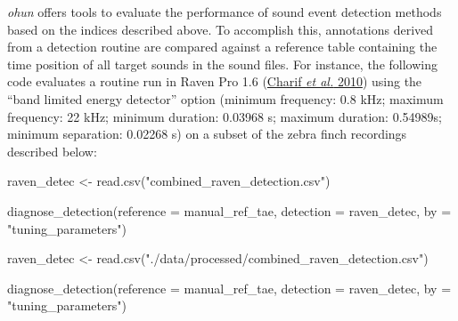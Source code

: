 \documentclass[
]{article}
\newenvironment{Shaded}{\begin{snugshade}}{\end{snugshade}}
\newcommand{\AttributeTok}[1]{\textcolor[rgb]{0.77,0.63,0.00}{#1}}
\newcommand{\FunctionTok}[1]{\textcolor[rgb]{0.00,0.00,0.00}{#1}}
\newcommand{\NormalTok}[1]{#1}
\newcommand{\OtherTok}[1]{\textcolor[rgb]{0.56,0.35,0.01}{#1}}
\newcommand{\StringTok}[1]{\textcolor[rgb]{0.31,0.60,0.02}{#1}}
\begin{document}
\emph{ohun} offers tools to evaluate the performance of sound event
detection methods based on the indices described above. To accomplish
this, annotations derived from a detection routine are compared against
a reference table containing the time position of all target sounds in
the sound files. For instance, the following code evaluates a routine
run in Raven Pro 1.6 (\protect\hyperlink{ref-Charif2010}{Charif \emph{et
al.} 2010}) using the ``band limited energy detector'' option (minimum
frequency: 0.8 kHz; maximum frequency: 22 kHz; minimum duration: 0.03968
s; maximum duration: 0.54989s; minimum separation: 0.02268 s) on a
subset of the zebra finch recordings described below:

\begin{Shaded}
\begin{Highlighting}[]
\NormalTok{raven\_detec }\OtherTok{\textless{}{-}} \FunctionTok{read.csv}\NormalTok{(}\StringTok{"combined\_raven\_detection.csv"}\NormalTok{)}

\FunctionTok{diagnose\_detection}\NormalTok{(}\AttributeTok{reference =}\NormalTok{ manual\_ref\_tae, }\AttributeTok{detection =}\NormalTok{ raven\_detec, }\AttributeTok{by =} \StringTok{"tuning\_parameters"}\NormalTok{)}
\end{Highlighting}
\end{Shaded}

\begin{Shaded}
\begin{Highlighting}[]
\NormalTok{raven\_detec }\OtherTok{\textless{}{-}} \FunctionTok{read.csv}\NormalTok{(}\StringTok{"./data/processed/combined\_raven\_detection.csv"}\NormalTok{)}

\FunctionTok{diagnose\_detection}\NormalTok{(}\AttributeTok{reference =}\NormalTok{ manual\_ref\_tae, }\AttributeTok{detection =}\NormalTok{ raven\_detec, }\AttributeTok{by =} \StringTok{"tuning\_parameters"}\NormalTok{)}
\end{Highlighting}
\end{Shaded}
\end{document}
